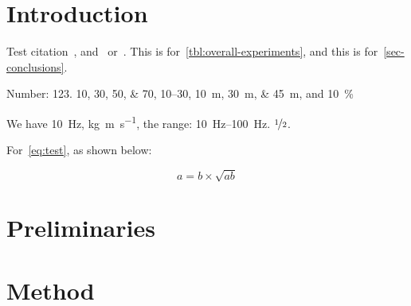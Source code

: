 \section{Introduction}\label{sec-intro}

Test citation~\cite{BJL11J01}, and~\citep{BJL11J01} or~\citet{BJL11J01}.
This is for~\cref{tbl:overall-experiments}, 
and this is for~\cref{sec-conclusions}.
%

\begin{JournalA}
Number:
\num{123}.
\numlist{10;30;50;70},
\numrange{10}{30},
\SIlist{10;30;45}{\metre},
and
\SI{10}{\percent}


\end{JournalA}

\begin{JournalB}
We have \SI{10}{\hertz},
\si{\kilogram\metre\per\second},
the range: \SIrange{10}{100}{\hertz}.
$\nicefrac[]{1}{2}$.


\end{JournalB}


For~\cref{eq:test},
as shown below:

\begin{equation}\label{eq:test}
a = b \times \sqrt{ab}
\end{equation}

\blindmathpaper

\section{Preliminaries} \label{sec-preliminaries}

\blindtext

\gliMarker


\section{Method} \label{sec-method}


 
 
 
 
